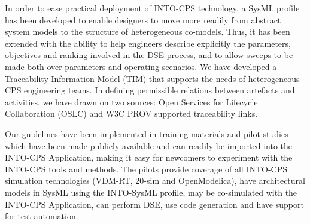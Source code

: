 In order to ease practical deployment of INTO-CPS technology, a SysML profile has been developed to enable designers to move more readily from abstract system models to the structure of heterogeneous co-models. Thus, it has been extended with the ability to help engineers describe explicitly the parameters, objectives and ranking involved in the DSE process, and to allow sweeps to be made both over parameters and operating scenarios. We have developed a Traceability Information Model (TIM) that supports the needs of heterogeneous CPS engineering teams. In defining permissible relations between artefacts and activities, we have drawn on two sources: Open Services for Lifecycle Collaboration (OSLC)  and W3C PROV  supported traceability links.

Our guidelines have been implemented in training materials and pilot studies which have been made publicly available and can readily be imported into the INTO-CPS Application, making it easy for newcomers to experiment with the INTO-CPS tools and methods. The pilots provide coverage of all INTO-CPS simulation technologies (VDM-RT, 20-sim and OpenModelica), have architectural models in SysML using the INTO-SysML profile, may be co-simulated with the INTO-CPS Application, can perform DSE, use code generation and have support for test automation. 
